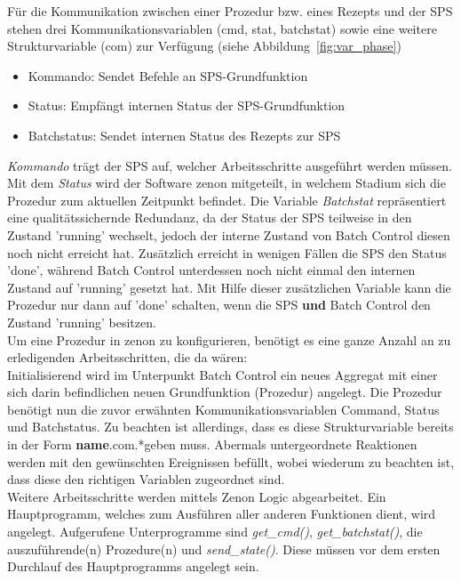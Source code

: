 	Für die Kommunikation zwischen einer Prozedur bzw. eines Rezepts und der \ac{SPS} stehen drei Kommunikationsvariablen (cmd, stat, batchstat) sowie eine weitere Strukturvariable (com) zur Verfügung (siehe Abbildung~\ref{fig:var_phase})
	
	\begin{itemize}
		\item Kommando: Sendet Befehle an \ac{SPS}-Grundfunktion
		\item Status: Empfängt internen Status der \ac{SPS}-Grundfunktion
		\item Batchstatus: Sendet internen Status des Rezepts zur \ac{SPS}
	\end{itemize}

	\textit{Kommando} trägt der \ac{SPS} auf, welcher Arbeitsschritte ausgeführt werden müssen. Mit dem \textit{Status} wird der Software zenon mitgeteilt, in welchem Stadium sich die Prozedur zum aktuellen Zeitpunkt befindet. Die Variable \textit{Batchstat} repräsentiert eine qualitätssichernde Redundanz, da der Status der \ac{SPS} teilweise in den Zustand 'running' wechselt, jedoch der interne Zustand von Batch Control diesen noch nicht erreicht hat. Zusätzlich erreicht in wenigen Fällen die \ac{SPS} den Status 'done', während Batch Control unterdessen noch nicht einmal den internen Zustand auf 'running' gesetzt hat. Mit Hilfe dieser zusätzlichen Variable kann die Prozedur nur dann auf 'done' schalten, wenn die \ac{SPS} \textbf{und} Batch Control den Zustand 'running' besitzen.\\
	
	Um eine Prozedur in zenon zu konfigurieren, benötigt es eine ganze Anzahl an zu erledigenden Arbeitsschritten, die da wären:\\

	Initialisierend wird im Unterpunkt Batch Control ein neues Aggregat mit einer sich darin befindlichen neuen Grundfunktion (Prozedur) angelegt. Die Prozedur benötigt nun die zuvor erwähnten Kommunikationsvariablen Command, Status und Batchstatus. Zu beachten ist allerdings, dass es diese Strukturvariable bereits in der Form \glqq \textbf{name}.com.*\grqq \space geben muss. Abermals untergeordnete Reaktionen werden mit den gewünschten Ereignissen befüllt, wobei wiederum zu beachten ist, dass diese den richtigen Variablen zugeordnet sind.\\

	Weitere Arbeitsschritte werden mittels Zenon Logic abgearbeitet. Ein Hauptprogramm, welches zum Ausführen aller anderen Funktionen dient, wird angelegt. Aufgerufene Unterprogramme sind \textit{get\_cmd()}, \textit{get\_batchstat()}, die auszuführende(n) Prozedure(n) und \textit{send\_state()}. Diese müssen vor dem ersten Durchlauf des Hauptprogramms angelegt sein.\\
	
